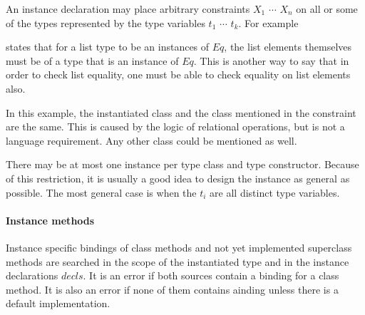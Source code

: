 An instance declaration may place arbitrary constraints $X_1$ $\cdots$ $X_n$ on all or some of the types represented by the type variables $t_1$ $\cdots$ $t_k$. For example


states that for a list type to be an instances of $Eq$, the list elements themselves must be of a type that is an instance of $Eq$. This is another way to say that in order to check list equality, one must be able to check equality on list elements also.

In this example, the instantiated class and the class mentioned in the constraint are the same. This is caused by the logic of relational operations, but is not a language requirement. Any other class could be mentioned as well.

There may be at most one instance per type class and type constructor. Because of this restriction, it is usually a good idea to design the instance as general as possible. The most general case is when the $t_i$ are all distinct type variables.



\paragraph*{Instance methods}
Instance specific bindings of class methods and not yet implemented superclass methods are searched in the scope of the instantiated type and in the instance declarations $decls$.
It is an error if both sources contain a binding for a class method. It is also an error if none of them contains ainding unless  there is a default implementation.

